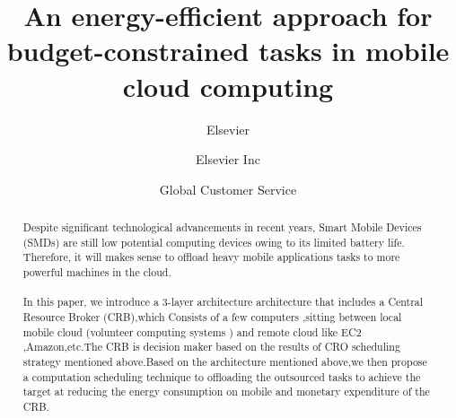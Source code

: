 \documentclass[review]{elsarticle}
\begin{document}
\begin{frontmatter}

\title{An energy-efficient approach for budget-constrained tasks in mobile cloud computing}

\author{Elsevier}
\address{Radarweg 29, Amsterdam}

\author[mymainaddress,mysecondaryaddress]{Elsevier Inc}

\author[mysecondaryaddress]{Global Customer Service}

\address[mymainaddress]{1600 John F Kennedy Boulevard, Philadelphia}
\address[mysecondaryaddress]{360 Park Avenue South, New York}

\begin{abstract}
   Despite significant technological advancements in recent years, Smart Mobile Devices (SMDs) are still low potential computing devices owing to its limited battery life. Therefore, it will makes sense to offload heavy mobile applications tasks to more powerful machines in the cloud. 
   \paragraph{} In this paper, we introduce a 3-layer architecture architecture that includes a Central Resource Broker (CRB),which Consists of a few computers ,sitting between local mobile cloud (volunteer computing systems ) and remote cloud like EC2 ,Amazon,etc.The CRB is decision maker based on the results of CRO scheduling strategy mentioned above.Based on the architecture mentioned above,we then propose a computation scheduling technique to offloading the outsourced tasks to achieve the target at reducing the energy consumption on mobile and monetary expenditure of the CRB.

\end{abstract}
\end{frontmatter}
\end{document}
